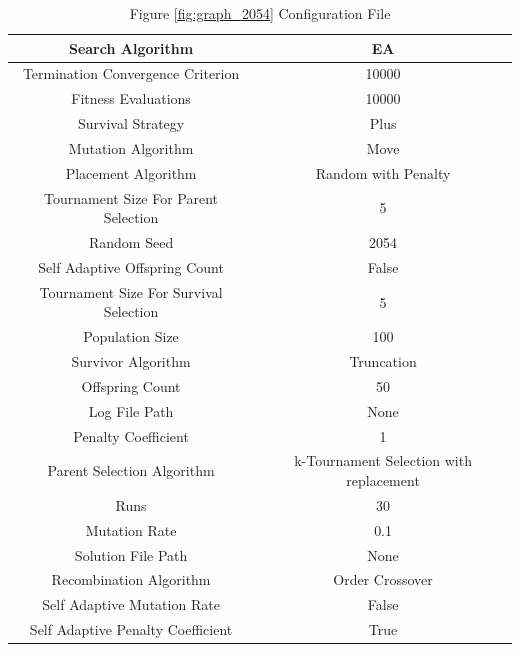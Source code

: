 \documentclass{standalone}
\begin{document}
\begin{table}[!htb]
	\centering
	\caption{Figure \ref{fig:graph_2054} Configuration File}
	\label{tab:graph_2054}
	\begin{tabular}{| c | c |}
		\hline
		Search Algorithm		& EA		 \\
		\hline
		Termination Convergence Criterion		& 10000		 \\
		\hline
		Fitness Evaluations		& 10000		 \\
		\hline
		Survival Strategy		& Plus		 \\
		\hline
		Mutation Algorithm		& Move		 \\
		\hline
		Placement Algorithm		& Random with Penalty		 \\
		\hline
		Tournament Size For Parent Selection		& 5		 \\
		\hline
		Random Seed		& 2054		 \\
		\hline
		Self Adaptive Offspring Count		& False		 \\
		\hline
		Tournament Size For Survival Selection		& 5		 \\
		\hline
		Population Size		& 100		 \\
		\hline
		Survivor Algorithm		& Truncation		 \\
		\hline
		Offspring Count		& 50		 \\
		\hline
		Log File Path		& None		 \\
		\hline
		Penalty Coefficient		& 1		 \\
		\hline
		Parent Selection Algorithm		& k-Tournament Selection with replacement		 \\
		\hline
		Runs		& 30		 \\
		\hline
		Mutation Rate		& 0.1		 \\
		\hline
		Solution File Path		& None		 \\
		\hline
		Recombination Algorithm		& Order Crossover		 \\
		\hline
		Self Adaptive Mutation Rate		& False		 \\
		\hline
		Self Adaptive Penalty Coefficient		& True		 \\
		\hline
	\end{tabular}
\end{table}
\end{document}
